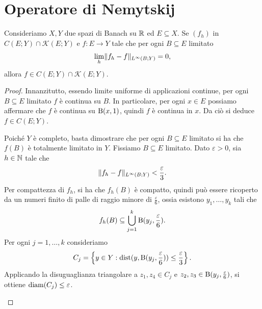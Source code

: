 \section{Operatore di Nemytskij}
\begin{lemma}\label{compattezzaelimitiuniformi}
	Consideriamo $X,Y$ due spazi di Banach su $\mathbb{R}$ ed $E \subseteq X$. Se $(f_h)$ in $C(E;Y)\cap \mathcal{K}(E;Y)$ e $f: E \to Y$ tale che per ogni $B \subseteq E$ limitato 
	\[ \lim\limits_{h} \lVert f_h-f\rVert_{L^\infty(B;Y)} = 0, \]
	allora $f \in C(E;Y)\cap \mathcal{K}(E;Y)$.
\end{lemma}
\begin{proof}
	Innanzitutto, essendo limite uniforme di applicazioni continue, per ogni $B \subseteq E$ limitato $f$ è continua su $B$. In particolare, per ogni $x \in E$ possiamo affermare che $f$ è continua su $\textup{B}(x,1)$, quindi $f$ è continua in $x$. Da ciò si deduce $f \in C(E;Y)$. 
	
	Poiché $Y$ è completo, basta dimostrare che per ogni $B \subseteq E$ limitato si ha che $f(B)$ è totalmente limitato in $Y$. Fissiamo $B \subseteq E$ limitato. Dato $\varepsilon >0$, sia $h \in \mathbb{N}$ tale che 
	\[ \lVert f_h-f\rVert_{L^\infty(B;Y)} < \frac{\varepsilon}{3}. \]
	Per compattezza di $f_h$, si ha che $f_h(B)$ è compatto, quindi può essere ricoperto da un numeri finito di palle di raggio minore di $\frac{\varepsilon}{6}$, ossia esistono $y_1,\dots,y_k$ tali che
	\[ f_h(B) \subseteq \bigcup_{j=1}^k \textup{B}(y_j,\frac{\varepsilon}{6}).\]
	Per ogni $j=1,\dots, k$ consideriamo 
	\[ C_j = \left\lbrace y \in Y: \textup{dist}(y, \textup{B}(y_j,\frac{\varepsilon}{6})) \le \frac{\varepsilon}{3} \right\rbrace. \]
	Applicando la disuguaglianza triangolare a $z_1,z_4 \in C_j$ e $z_2,z_3 \in \textup{B}(y_j,\frac{\varepsilon}{6})$, si ottiene $\textup{diam}(C_j) \le \varepsilon$.
	\begin{center}
		\begin{tikzpicture}[x=0.5pt,y=0.5pt,yscale=-1,xscale=1]
			

\end{tikzpicture}
\end{center}
\end{proof}
